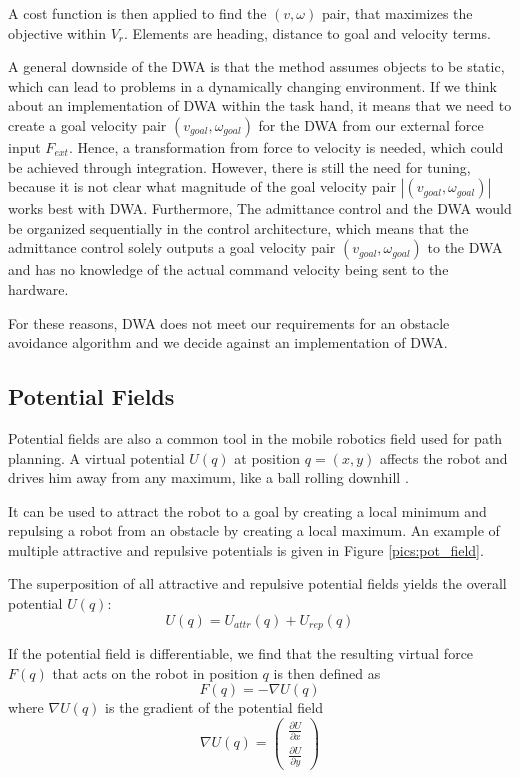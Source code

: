 A cost function is then applied to find the $(v,\omega)$ pair, that maximizes the objective within $V_r$. Elements are heading, distance to goal and velocity terms.

A general downside of the DWA is that the method assumes objects to be static, which can lead to problems in a dynamically changing environment. If we think about an implementation of DWA within the task hand, it means that we need to create a goal velocity pair $(v_{goal},\omega_{goal})$ for the DWA from our external force input $F_{ext}$. Hence, a transformation from force to velocity is needed, which could be achieved through integration. However, there is still the need for tuning, because it is not clear what magnitude of the goal velocity pair $|(v_{goal},\omega_{goal})|$ works best with DWA. Furthermore, The admittance control and the DWA would be organized sequentially in the control architecture, which means that the admittance control solely outputs a goal velocity pair $(v_{goal},\omega_{goal})$ to the DWA and has no knowledge of the actual command velocity being sent to the hardware.

For these reasons, DWA does not meet our requirements for an obstacle avoidance algorithm and we decide against an implementation of DWA.


\subsection{Potential Fields}
	\label{sec:pot_field}
Potential fields are also a common tool in the mobile robotics field used for path planning. A virtual potential $U(q)$ at position $q = (x,y)$ affects the robot and drives him away from any maximum, like a ball rolling downhill \citep{siegwart2004autonomous}.

It can be used to attract the robot to a goal by creating a local minimum and repulsing a robot from an obstacle by creating a local maximum. An example of multiple attractive and repulsive potentials is given in Figure \ref{pics:pot_field}.

The superposition of all attractive and repulsive potential fields yields the overall potential $U(q)$:
\begin{equation}
U(q) = U_{attr}(q) + U_{rep}(q)
	\label{eq:pot_field}
\end{equation}

If the potential field is differentiable, we find that the resulting virtual force $F(q)$ that acts on the robot in position $q$ is then defined as 
\begin{equation}
F(q) = - \nabla U(q) 
	\label{eq:pot_force}
\end{equation}
where $\nabla U(q)$ is the gradient of the potential field
\begin{equation}
\nabla U(q) = \begin{pmatrix}
\frac{\partial U}{\partial x} \\
\frac{\partial U}{\partial y}
\end{pmatrix}
	\label{eq:gradient}
\end{equation}

